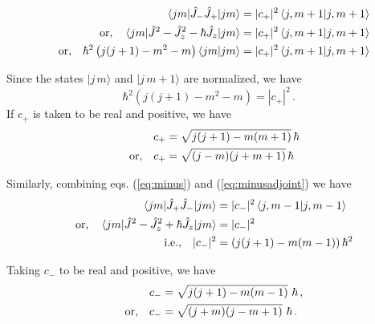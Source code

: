 \begin{align*}
\mel{j m}{\hat{J}_- \hat{J}_+ }{j m} &= |c_+|^2 \braket{j,m+1}{j,m+1} \\
\qq{or,}\mel{j m}{\hat{J}^2 - \hat{J}_z^2 - \hbar \hat{J}_z }{j m} &=  |c_+|^2 \braket{j,m+1}{j,m+1} \\
\qq{or,}  \hbar^2 \left( j(j+1)-m^2-m \right) \braket{j m}{j m} &= |c_+|^2  \braket{j,m+1}{j,m+1}
\end{align*}

Since the states $|j\,m\rangle$ and $|j\, m+1\rangle$ are normalized, we have
\begin{equation*}
\hbar^2 \left( j(j+1)-m^2-m\right) = |c_+|^2 \, . 
\end{equation*}
If $c_+$ is taken to be real and positive, we have
\begin{align}
c_+ &= \sqrt{j(j+1)-m(m+1)}\, \hbar \nonumber\\
\qq{or,} c_+ &= \sqrt{(j-m)(j+m+1)}\, \hbar
\end{align}

Similarly, combining eqs. (\ref{eq:minus}) and (\ref{eq:minusadjoint}) we have
\begin{align*}
\mel{j m}{\hat{J}_+ \hat{J}_-}{j m} &= |c_-|^2 \braket{j,m-1}{j,m-1} \\
\qq{or,}\mel{j m}{\hat{J}^2-\hat{J}_z^2 +\hbar \hat{J}_z}{j m}
&= |c_-|^2  \\
\qq{i.e.,}|c_-|^2 &= \left( j(j+1)-m(m-1) \right) \hbar^2
\end{align*}

Taking $c_-$ to be real and positive, we have
\begin{align}
c_- &= \sqrt{j(j+1)-m(m-1)}\,\, \hbar \, ,  \nonumber\\
\qq{or,} c_- &=\sqrt{(j+m)(j-m+1)}\,\, \hbar\, . 
\end{align}


